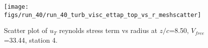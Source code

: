 \begin{figure}[H]
\centering
\texttt{[image: figs/run\_40/run\_40\_turb\_visc\_ettap\_top\_vs\_r\_meshscatter]}
\caption{Scatter plot of $
u_T$ reynolds stress term vs radius at $z/c$=8.50, $V_{free}$=33.44, station 4.}
\label{fig:run_40_turb_visc_ettap_top_vs_r_meshscatter}
\end{figure}


